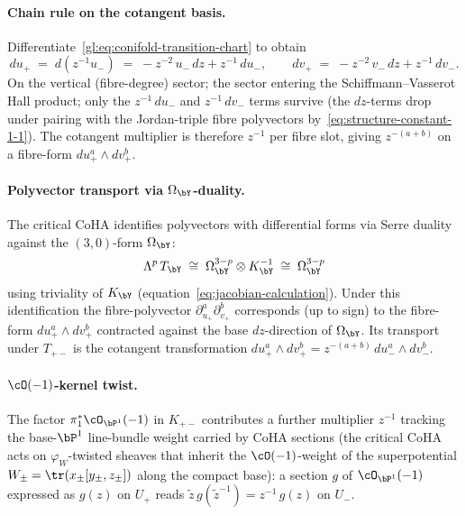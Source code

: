 \paragraph{Chain rule on the cotangent basis.}
Differentiate~\eqref{gl:eq:conifold-transition-chart} to obtain
\[
 du_+ \;=\; d(z^{-1} u_-) \;=\; -z^{-2}\, u_-\, dz + z^{-1}\, du_-,
 \qquad
 dv_+ \;=\; -z^{-2}\, v_-\, dz + z^{-1}\, dv_-.
\]
On the vertical (fibre-degree) sector; the sector entering the
Schiffmann--Vasserot Hall product; only the $z^{-1}\,du_-$ and
$z^{-1}\,dv_-$ terms survive (the $dz$-terms drop under pairing with the
Jordan-triple fibre polyvectors by~\eqref{eq:structure-constant-1-1}).
The cotangent multiplier is therefore $z^{-1}$ per fibre slot, giving
$z^{-(a+b)}$ on a fibre-form $du_+^a \wedge dv_+^b$.

\paragraph{Polyvector transport via $\Omega_\bY$-duality.}
The critical CoHA identifies polyvectors with differential forms via
Serre duality against the $(3,0)$-form $\Omega_\bY$:
\[
 \Lambda^p\, T_{\bY} \;\cong\; \Omega^{3-p}_\bY \otimes K_\bY^{-1}
 \;\cong\; \Omega^{3-p}_\bY
\]
using triviality of $K_\bY$ (equation~\eqref{eq:jacobian-calculation}).
Under this identification the fibre-polyvector $\partial_{u_+}^a
\partial_{v_+}^b$ corresponds (up to sign) to the fibre-form
$du_+^a \wedge dv_+^b$ contracted against the base $dz$-direction of
$\Omega_\bY$. Its transport under $T_{+-}$ is the cotangent transformation
$du_+^a \wedge dv_+^b = z^{-(a+b)}\, du_-^a \wedge dv_-^b$.

\paragraph{$\cO(-1)$-kernel twist.}
The factor $\pi_1^*\cO_{\bP^1}(-1)$ in $K_{+-}$ contributes a further
multiplier $z^{-1}$ tracking the base-$\bP^1$ line-bundle weight carried
by CoHA sections (the critical CoHA acts on $\varphi_W$-twisted sheaves
that inherit the $\cO(-1)$-weight of the superpotential
$W_\pm = \tr(x_\pm [y_\pm, z_\pm])$ along the compact base): a section
$g$ of $\cO_{\bP^1}(-1)$ expressed as $g(z)$ on $U_+$ reads
$\tilde z\, g(\tilde z^{-1}) = z^{-1}\, g(z)$ on $U_-$.

